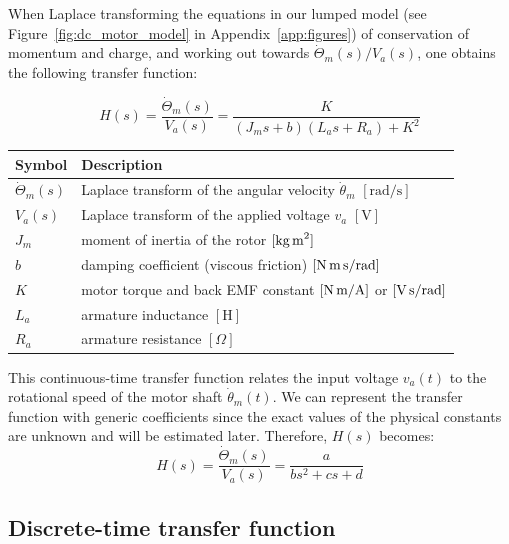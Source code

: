 \documentclass{article}
\begin{document}
	\noindent When Laplace transforming the equations in our lumped model (see Figure~\ref{fig:dc_motor_model} in Appendix~\ref{app:figures}) of conservation of momentum and charge, and working out towards $\dot{\Theta}_m(s)/V_a(s)$, one obtains the following transfer function:
	
	\begin{equation}
		H(s) = \frac{\dot{\Theta}_m(s)}{V_a(s)} = \frac{K}{(J_ms + b)(L_as + R_a) + K^2} 
		\label{eq: CT transfer function DC}
	\end{equation}
	
	\begin{table}[htbp]
		\centering
		\label{tab:laplace_variables}
		\begin{tabular}{@{}ll@{}}
			\toprule
			\textbf{Symbol} & \textbf{Description} \\ \midrule
			\( \dot{\Theta}_m(s) \) & Laplace transform of the angular velocity $\dot{\theta}_m$ \([ \text{rad/s} ]\)  \\
			\( V_a(s) \) & Laplace transform of the applied voltage $v_a$ \([ \text{V} ]\) \\
			\( J_m \) & moment of inertia of the rotor \([ \text{kg\,m}^2 ]\) \\
			\( b \) & damping coefficient (viscous friction) \([ \text{N\,m\,s/rad} ]\) \\
			\( K \) & motor torque and back EMF constant \([ \text{N\,m/A} ]\) or \([ \text{V\,s/rad} ]\) \\
			\( L_a \) & armature inductance \([ \text{H} ]\) \\
			\( R_a \) & armature resistance \([ \Omega ]\) \\
			\bottomrule
		\end{tabular}
	\end{table}
	
	\noindent This continuous-time transfer function relates the input voltage \( v_a(t) \) to the rotational speed of the motor shaft \( \dot{\theta}_m(t) \). We can represent the transfer function with generic coefficients since the exact values of the physical constants are unknown and will be estimated later. Therefore, \( H(s) \) becomes:
	\begin{equation}
		H(s) = \frac{\dot{\Theta}_m(s)}{V_a(s)} = \frac{a}{bs^2+cs+d} 
	\end{equation}
	

	
	\subsection{Discrete-time transfer function}
	
\end{document}
